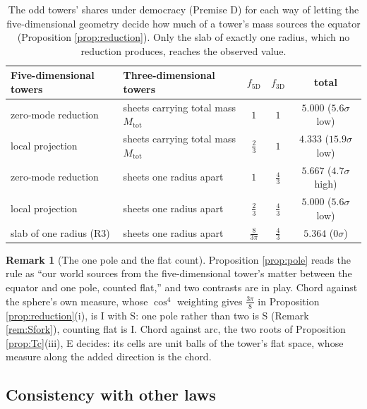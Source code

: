 \documentclass[11pt]{article}
\theoremstyle{definition}
\newtheorem{remark}[theorem]{Remark}
\begin{document}
\begin{table}[htbp]\centering\small
\begin{tabular}{llccc}
\toprule
Five-dimensional towers & Three-dimensional towers & $f_{5\mathrm{D}}$ & $f_{3\mathrm{D}}$ & total \\
\midrule
zero-mode reduction & sheets carrying total mass $M_{\mathrm{tot}}$ & $1$ & $1$ & $5.000$ ($5.6\sigma$ low) \\[2pt]
local projection & sheets carrying total mass $M_{\mathrm{tot}}$ & $\tfrac{2}{3}$ & $1$ & $4.333$ ($15.9\sigma$ low) \\[2pt]
zero-mode reduction & sheets one radius apart & $1$ & $\tfrac{4}{3}$ & $5.667$ ($4.7\sigma$ high) \\[2pt]
local projection & sheets one radius apart & $\tfrac{2}{3}$ & $\tfrac{4}{3}$ & $5.000$ ($5.6\sigma$ low) \\[2pt]
slab of one radius (R3) & sheets one radius apart & $\tfrac{8}{3\pi}$ & $\tfrac{4}{3}$ & $5.364$ ($0\sigma$) \\[2pt]
\bottomrule
\end{tabular}
\caption{The odd towers' shares under democracy (Premise D) for each way of letting the five-dimensional geometry decide how much of a tower's mass sources the equator (Proposition \ref{prop:reduction}). Only the slab of exactly one radius, which no reduction produces, reaches the observed value.}
\label{tab:reductions}
\end{table}

\begin{remark}[The one pole and the flat count]\label{rem:onepole}
Proposition \ref{prop:pole} reads the rule as ``our world sources from the five-dimensional tower's matter between the equator and one pole, counted flat,'' and two contrasts are in play. Chord against the sphere's own measure, whose $\cos^{4}$ weighting gives $\tfrac{3\pi}{8}$ in Proposition \ref{prop:reduction}(i), is I with S: one pole rather than two is S (Remark \ref{rem:Sfork}), counting flat is I. Chord against arc, the two roots of Proposition \ref{prop:Tc}(iii), E decides: its cells are unit balls of the tower's flat space, whose measure along the added direction is the chord.
\end{remark}

\subsection{Consistency with other laws}\label{subsec:consistency}
\end{document}
